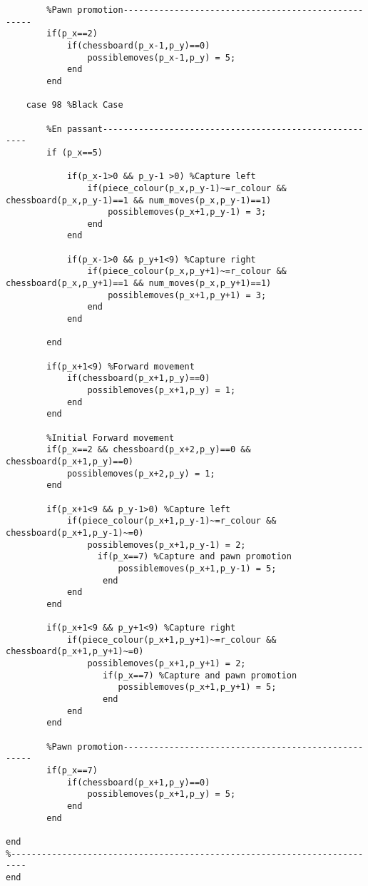 \documentclass{article}
\begin{document}
\begin{lstlisting}
        %Pawn promotion----------------------------------------------------
        if(p_x==2) 
            if(chessboard(p_x-1,p_y)==0)
                possiblemoves(p_x-1,p_y) = 5;
            end
        end
       
    case 98 %Black Case
    
        %En passant-------------------------------------------------------
        if (p_x==5)
            
            if(p_x-1>0 && p_y-1 >0) %Capture left
                if(piece_colour(p_x,p_y-1)~=r_colour && chessboard(p_x,p_y-1)==1 && num_moves(p_x,p_y-1)==1)
                    possiblemoves(p_x+1,p_y-1) = 3;
                end
            end

            if(p_x-1>0 && p_y+1<9) %Capture right
                if(piece_colour(p_x,p_y+1)~=r_colour && chessboard(p_x,p_y+1)==1 && num_moves(p_x,p_y+1)==1)
                    possiblemoves(p_x+1,p_y+1) = 3;
                end    
            end
        
        end
        
        if(p_x+1<9) %Forward movement
            if(chessboard(p_x+1,p_y)==0) 
                possiblemoves(p_x+1,p_y) = 1;
            end
        end

        %Initial Forward movement
        if(p_x==2 && chessboard(p_x+2,p_y)==0 && chessboard(p_x+1,p_y)==0)
            possiblemoves(p_x+2,p_y) = 1;
        end
        
        if(p_x+1<9 && p_y-1>0) %Capture left
            if(piece_colour(p_x+1,p_y-1)~=r_colour && chessboard(p_x+1,p_y-1)~=0)
                possiblemoves(p_x+1,p_y-1) = 2;
                  if(p_x==7) %Capture and pawn promotion
                      possiblemoves(p_x+1,p_y-1) = 5;
                   end
            end
        end
        
        if(p_x+1<9 && p_y+1<9) %Capture right
            if(piece_colour(p_x+1,p_y+1)~=r_colour && chessboard(p_x+1,p_y+1)~=0)
                possiblemoves(p_x+1,p_y+1) = 2;
                   if(p_x==7) %Capture and pawn promotion
                      possiblemoves(p_x+1,p_y+1) = 5;
                   end
            end   
        end
        
        %Pawn promotion----------------------------------------------------
        if(p_x==7)
            if(chessboard(p_x+1,p_y)==0) 
                possiblemoves(p_x+1,p_y) = 5;
            end
        end
   
end
%-------------------------------------------------------------------------
end
\end{lstlisting}
\end{document}
